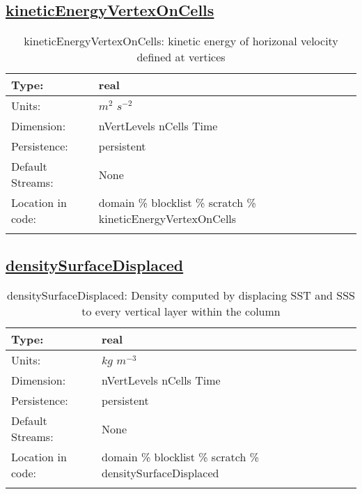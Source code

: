 \subsection[kineticEnergyVertexOnCells]{\hyperref[sec:var_tab_scratch]{kineticEnergyVertexOnCells}}
\label{subsec:var_sec_scratch_kineticEnergyVertexOnCells}
\begin{center}
\begin{longtable}{| p{2.0in} | p{4.0in} |}
        \hline 
        Type: & real \\
        \hline 
        Units: & $m^2$ $s^{-2}$ \\
        \hline 
        Dimension: & nVertLevels nCells Time \\
        \hline 
        Persistence: & persistent \\
        \hline 
		 Default Streams: & None \\
        \hline 
		 Location in code: & domain \% blocklist \% scratch \% kineticEnergyVertexOnCells \\
		 \hline 
    \caption{kineticEnergyVertexOnCells: kinetic energy of horizonal velocity defined at vertices}
\end{longtable}
\end{center}
\subsection[densitySurfaceDisplaced]{\hyperref[sec:var_tab_scratch]{densitySurfaceDisplaced}}
\label{subsec:var_sec_scratch_densitySurfaceDisplaced}
\begin{center}
\begin{longtable}{| p{2.0in} | p{4.0in} |}
        \hline 
        Type: & real \\
        \hline 
        Units: & $kg$ $m^{-3}$ \\
        \hline 
        Dimension: & nVertLevels nCells Time \\
        \hline 
        Persistence: & persistent \\
        \hline 
		 Default Streams: & None \\
        \hline 
		 Location in code: & domain \% blocklist \% scratch \% densitySurfaceDisplaced \\
		 \hline 
    \caption{densitySurfaceDisplaced: Density computed by displacing SST and SSS to every vertical layer within the column}
\end{longtable}
\end{center}
